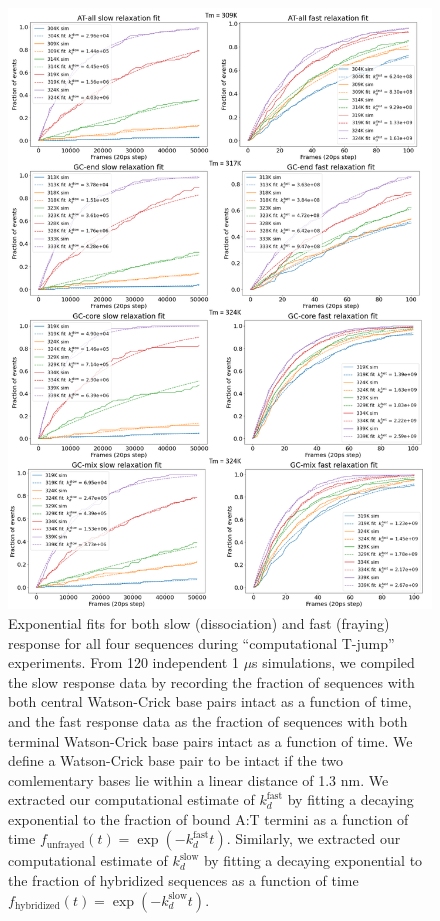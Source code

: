 \documentclass[journal=jpcbfk,manuscript=article]{achemso}
\begin{document}
\begin{figure}[ht!]
	\centering
    \includegraphics[width=.75\textwidth]{FigS4.pdf}
    \caption{Exponential fits for both slow (dissociation) and fast (fraying) response for all four sequences during ``computational T-jump'' experiments. From 120 independent 1 $\mu$s simulations, we compiled the slow response data by recording the fraction of sequences with both central Watson-Crick base pairs intact as a function of time, and the fast response data as the fraction of sequences with both terminal Watson-Crick base pairs intact as a function of time. We define a Watson-Crick base pair to be intact if the two comlementary bases lie within a linear distance of 1.3 nm. We extracted our computational estimate of $k_d^\mathrm{fast}$ by fitting a decaying exponential to the fraction of bound A:T termini as a function of time $f_\mathrm{unfrayed}(t) = \exp(-k_d^\mathrm{fast}t)$. Similarly, we extracted our computational estimate of $k_d^\mathrm{slow}$ by fitting a decaying exponential to the fraction of hybridized sequences as a function of time $f_\mathrm{hybridized}(t) = \exp(-k_d^\mathrm{slow}t)$.}
    \label{fig:SIFig4}
\end{figure}

\clearpage
\newpage
\end{document}
